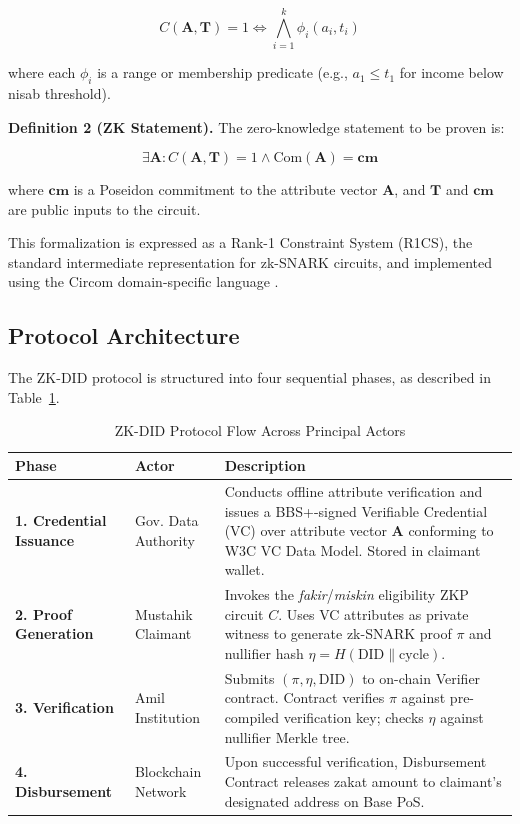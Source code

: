 \documentclass[conference]{IEEEtran}
\begin{document}
\begin{equation}
    C(\mathbf{A}, \mathbf{T}) = 1 \iff \bigwedge_{i=1}^{k} \phi_i(a_i, t_i)
\end{equation}

where each $\phi_i$ is a range or membership predicate (e.g., $a_1 \leq t_1$ for income below nisab threshold).

\textbf{Definition 2 (ZK Statement).} The zero-knowledge statement to be proven is:

\begin{equation}
    \exists \mathbf{A} : C(\mathbf{A}, \mathbf{T}) = 1 \wedge \text{Com}(\mathbf{A}) = \mathbf{cm}
\end{equation}

where $\mathbf{cm}$ is a Poseidon commitment to the attribute vector $\mathbf{A}$, and $\mathbf{T}$ and $\mathbf{cm}$ are public inputs to the circuit.

This formalization is expressed as a Rank-1 Constraint System (R1CS), the standard intermediate representation for zk-SNARK circuits, and implemented using the Circom domain-specific language \cite{wen2023}.

\subsection{Protocol Architecture}

The ZK-DID protocol is structured into four sequential phases, as described in Table~\ref{tab:protocol_flow}.

\begin{table}[h]
\caption{ZK-DID Protocol Flow Across Principal Actors}
\label{tab:protocol_flow}
\centering
\begin{tabularx}{\columnwidth}{>{\bfseries}p{1.6cm} p{1.5cm} X}
\toprule
\textbf{Phase} & \textbf{Actor} & \textbf{Description} \\
\midrule
1. Credential Issuance & Gov. Data Authority & Conducts offline attribute verification and issues a BBS+-signed Verifiable Credential (VC) over attribute vector $\mathbf{A}$ conforming to W3C VC Data Model. Stored in claimant wallet. \\
\midrule
2. Proof Generation & Mustahik Claimant & Invokes the \textit{fakir}/\textit{miskin} eligibility ZKP circuit $C$. Uses VC attributes as private witness to generate zk-SNARK proof $\pi$ and nullifier hash $\eta = H(\text{DID} \| \text{cycle})$. \\
\midrule
3. Verification & Amil Institution & Submits $(\pi, \eta, \text{DID})$ to on-chain Verifier contract. Contract verifies $\pi$ against pre-compiled verification key; checks $\eta$ against nullifier Merkle tree. \\
\midrule
4. Disbursement & Blockchain Network & Upon successful verification, Disbursement Contract releases zakat amount to claimant's designated address on Base PoS. \\
\bottomrule
\end{tabularx}
\end{table}
\end{document}
